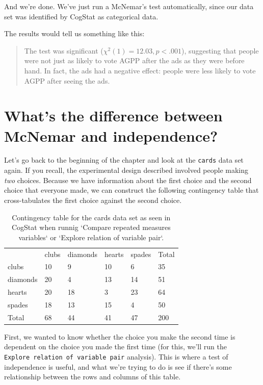 \documentclass[
]{book}
\theoremstyle{definition}
\theoremstyle{definition}
\theoremstyle{definition}
\theoremstyle{definition}
\theoremstyle{remark}
\begin{document}
And we're done. We've just run a McNemar's test automatically, since our data set was identified by CogStat as categorical data.

The results would tell us something like this:

\begin{quote}
The test was significant (\(\chi^2(1) = 12.03, p<.001\)), suggesting that people were not just as likely to vote AGPP after the ads as they were before hand. In fact, the ads had a negative effect: people were less likely to vote AGPP after seeing the ads.
\end{quote}

\hypertarget{whats-the-difference-between-mcnemar-and-independence}{%
\section{What's the difference between McNemar and independence?}\label{whats-the-difference-between-mcnemar-and-independence}}

Let's go back to the beginning of the chapter and look at the \texttt{cards} data set again. If you recall, the experimental design described involved people making \emph{two} choices. Because we have information about the first choice and the second choice that everyone made, we can construct the following contingency table that cross-tabulates the first choice against the second choice.

\begin{table}[!h]

\caption{\label{tab:unnamed-chunk-50}Contingency table for the cards data set as seen in CogStat when runnig `Compare repeated measures variables` or `Explore relation of variable pair`.}
\centering
\begin{tabular}[t]{llllll}
\toprule
 & clubs & diamonds & hearts & spades & Total\\
clubs & 10 & 9 & 10 & 6 & 35\\
diamonds & 20 & 4 & 13 & 14 & 51\\
hearts & 20 & 18 & 3 & 23 & 64\\
spades & 18 & 13 & 15 & 4 & 50\\
Total & 68 & 44 & 41 & 47 & 200\\
\bottomrule
\end{tabular}
\end{table}

First, we wanted to know whether the choice you make the second time is dependent on the choice you made the first time (for this, we'll run the \texttt{Explore\ relation\ of\ variable\ pair} analysis). This is where a test of independence is useful, and what we're trying to do is see if there's some relationship between the rows and columns of this table.
\end{document}

